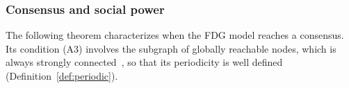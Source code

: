 

\subsubsection{Consensus and social power}
\label{subsubsec:consensus}

The following theorem characterizes when the FDG model reaches a consensus. Its
condition (A3) involves the subgraph of globally reachable nodes, which is always
strongly connected~\cite{baggio_dt}, so that its periodicity is well defined
(Definition~\ref{def:periodic}).

